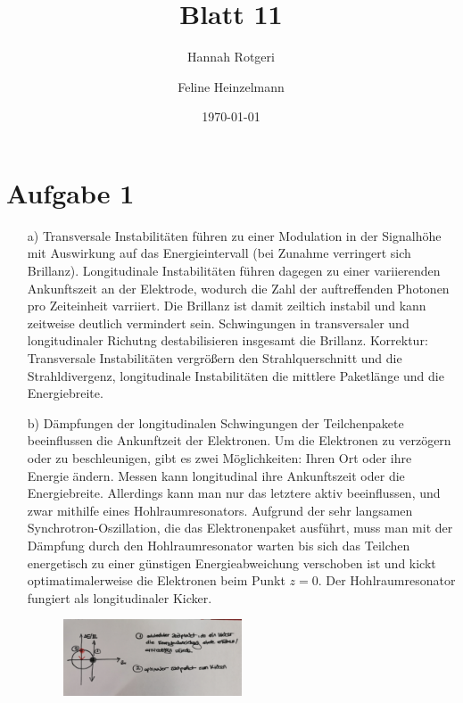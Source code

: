 \documentclass[11pt,a4paper]{article}
\title{Blatt 11}
\date{\today}
\author{Hannah Rotgeri \and Feline Heinzelmann}
\begin{document}
    \maketitle

    \section*{Aufgabe 1}
	\begin{itemize}
		\item[a)] 
			Transversale Instabilitäten führen zu einer Modulation in der Signalhöhe mit Auswirkung auf das Energieintervall (bei Zunahme verringert sich Brillanz).
			Longitudinale Instabilitäten führen dagegen zu einer variierenden Ankunftszeit an der Elektrode, wodurch die Zahl der auftreffenden Photonen pro Zeiteinheit varriiert. 
			Die Brillanz ist damit zeiltich instabil und kann zeitweise deutlich vermindert sein. 
			Schwingungen in transversaler und longitudinaler Richutng destabilisieren insgesamt die Brillanz. \newline
			Korrektur: Transversale Instabilitäten vergrößern den Strahlquerschnitt und die Strahldivergenz, longitudinale Instabilitäten die mittlere Paketlänge und die Energiebreite.

		\item[b)]
			Dämpfungen der longitudinalen Schwingungen der Teilchenpakete beeinflussen die Ankunftzeit der Elektronen. Um die Elektronen zu verzögern oder zu beschleunigen, gibt es zwei Möglichkeiten: Ihren Ort oder ihre Energie ändern. Messen kann longitudinal ihre Ankunftszeit oder die Energiebreite.
			Allerdings kann man nur das letztere aktiv beeinflussen, und zwar mithilfe eines Hohlraumresonators. Aufgrund der sehr langsamen Synchrotron-Oszillation, die das Elektronenpaket ausführt, muss man mit der Dämpfung durch den Hohlraumresonator warten bis sich das Teilchen energetisch 
			zu einer günstigen Energieabweichung verschoben ist und kickt optimatimalerweise die Elektronen beim Punkt $z=0$. Der Hohlraumresonator fungiert als longitudinaler Kicker.
			\begin{figure}
				\includegraphics[width=0.5\textwidth]{IMG_20200708_085910.jpg}
			\end{figure}

	\end{itemize}
\end{document}
